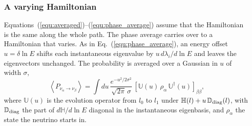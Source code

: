 \documentclass[final,5p,times,twocolumn,sort,compress]{elsarticle}
\makeatletter
\newcommand{\eq}{Eq.}
\DeclareRobustCommand{\_}{%
  \ifmmode\nfss@text{\textunderscore}\else\textunderscore\allowbreak\fi}
\newcommand{\equ}[1]{\eq~(\ref{equ:#1})}
\makeatother
\begin{document}

\subsubsection{A varying Hamiltonian}

Equations~(\ref{equ:averaged})--(\ref{equ:phase_average}) assume that the Hamiltonian is the same along the whole path. The phase average carries over to a Hamiltonian that varies. As in \equ{phase_average}, an energy offset $u = \delta \ln E$ shifts each instantaneous eigenvalue by $u\, d\lambda_i/d\ln E$ and leaves the eigenvectors unchanged. The probability is averaged over a Gaussian in $u$ of width $\sigma$,
\begin{equation}
 \label{equ:phase_average_varying}
 \left\langle P_{\nu_\alpha \to \nu_\beta} \right\rangle
 =
 \int du\, \frac{e^{-u^2/2\sigma^2}}{\sqrt{2\pi}\,\sigma}\,
 \left[ \mathbb{U}(u)\, \rho_\alpha\, \mathbb{U}^\dagger(u) \right]_{\beta\beta} ,
\end{equation}
where $\mathbb{U}(u)$ is the evolution operator from $l_0$ to $l_1$ under $\mathbb{H}(l) + u\, \mathbb{D}_{\rm diag}(l)$, with $\mathbb{D}_{\rm diag}$ the part of $d\mathbb{H}/d\ln E$ diagonal in the instantaneous eigenbasis, and $\rho_\alpha$ the state the neutrino starts in.
\end{document}
